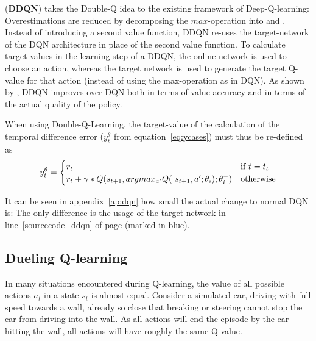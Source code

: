 \noindent {} (\textbf{DDQN}) takes the Double-Q idea to the existing framework of Deep-Q-learning: Overestimations are reduced by decomposing the $max$-operation into  and . Instead of introducing a second value function, DDQN re-uses the target-network of the DQN architecture in place of the second value function. To calculate target-values in the learning-step of a DDQN, the online network is used to choose an action, whereas the target network is used to generate the target Q-value for that action (instead of using the max-operation as in DQN). As shown by \cite{van_hasselt_deep_2015}, DDQN improves over DQN both in terms of value accuracy and in terms of the actual quality of the policy. 

When using Double-Q-Learning, the target-value of the calculation of the temporal difference error ($y_t^\theta$ from equation~\ref{eq:ycases}) must thus be re-defined as 
\begin{equation}
		y_t^\theta = \begin{cases} 
	r_t & \text{if } t = t_t\\
	r_t + \gamma * Q(s_{t+1}, argmax_{a'} Q($  $s_{t+1}, a'; \theta_i); \theta_i^-) & \text{otherwise} 
	\end{cases} %
\end{equation}

It can be seen in appendix~\ref{ap:dqn} how small the actual change to normal DQN is: The only difference is the usage of the target network in line~\ref{sourcecode_ddqn} of page \pageref{sourcecode_ddqn} (marked in blue).

\subsection{Dueling Q-learning}

\label{sec:dueling}

In many situations encountered during Q-learning, the value of all possible actions $a_t$ in a state $s_t$ is almost equal. Consider a simulated car, driving with full speed towards a wall, already so close that breaking or steering cannot stop the car from driving into the wall. As all actions will end the episode by the car hitting the wall, all actions will have roughly the same Q-value. 

